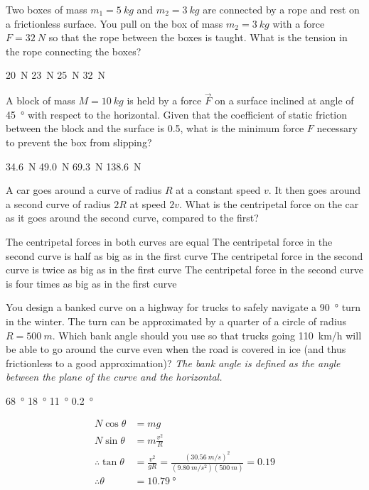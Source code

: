 \question Two boxes of mass $m_1=\SI{5}{kg}$ and $m_2=\SI{3}{kg}$ are connected by a rope and rest on a frictionless surface. You pull on the box of mass $m_2=\SI{3}{kg}$ with a force $F=\SI{32}{N}$ so that the rope between the boxes is taught. What is the tension in the rope connecting the boxes?
\begin{checkboxes} 
\CorrectChoice \SI{20}{N} \correct
\choice \SI{23}{N}
\choice \SI{25}{N}
\choice \SI{32}{N}
\end{checkboxes}


\question A block of mass $M=\SI{10}{kg}$ is held by a force $\vec F$ on a surface inclined at angle of \SI{45}{\degree} with respect to the horizontal. Given that the coefficient of static friction between the block and the surface is 0.5, what is the minimum force $F$ necessary to prevent the box from slipping? 
\begin{checkboxes} 
\CorrectChoice \SI{34.6}{N} \correct
\choice \SI{49.0}{N}
\choice \SI{69.3}{N}
\choice \SI{138.6}{N}
\end{checkboxes}


\question A car goes around a curve of radius $R$ at a constant speed $v$. It then goes around a second curve of radius $2R$ at speed $2v$. What is the centripetal force on the car as it goes around the second curve, compared to the first?
\begin{checkboxes} 
\choice The centripetal forces in both curves are equal
\choice The centripetal force in the second curve is half as big as in the first curve
\CorrectChoice The centripetal force in the second curve is twice as big as in the first curve \correct
\choice The centripetal force in the second curve is four times as big as in the first curve
\end{checkboxes}

\question You design a banked curve on a highway for trucks to safely navigate a \SI{90}{\degree} turn in the winter. The turn can be approximated by a quarter of a circle of radius $R=\SI{500}{m}$. Which bank angle should you use so that trucks going \SI{110}{km/h} will be able to go around the curve even when the road is covered in ice (and thus frictionless to a good approximation)? \textit{The bank angle is defined as the angle between the plane of the curve and the horizontal.}
\begin{checkboxes}
\choice \SI{68}{\degree}
\choice \SI{18}{\degree}
\CorrectChoice \SI{11}{\degree} \correct
\choice \SI{0.2}{\degree}
\end{checkboxes}
\begin{solution}
\begin{align*}
N\cos\theta &= mg\\
N\sin\theta &= m\frac{v^2}{R}\\
\therefore \tan\theta&=\frac{v^2}{gR}=\frac{(\SI{30.56}{m/s})^2}{(\SI{9.80}{m/s^2})(\SI{500}{m})}=0.19\\
\therefore \theta &= \SI{10.79}{\degree}
\end{align*}
\end{solution}

